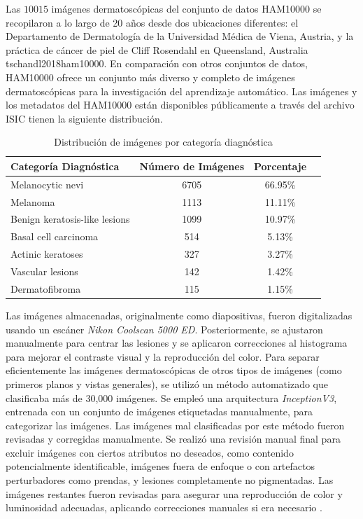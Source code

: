 Las $10015$ imágenes dermatoscópicas del conjunto de datos HAM10000 se recopilaron a lo largo de 20 años desde dos ubicaciones diferentes: el Departamento de Dermatología de la Universidad Médica de Viena, Austria, y la práctica de cáncer de piel de Cliff Rosendahl en Queensland, Australia {tschandl2018ham10000}. En comparación con otros conjuntos de datos, HAM10000 ofrece un conjunto más diverso y completo de imágenes dermatoscópicas para la investigación del aprendizaje automático. Las imágenes y los metadatos del HAM10000 están disponibles públicamente a través del archivo ISIC  tienen la siguiente distribución.

\begin{table}[ht]
   \centering
   \begin{tabular}{lccc}
   \hline
   \textbf{Categoría Diagnóstica} & \textbf{Número de Imágenes} & \textbf{Porcentaje} \\
   \hline
   Melanocytic nevi               & 6705                        & 66.95\%             \\
   Melanoma                       & 1113                        & 11.11\%             \\
   Benign keratosis-like lesions  & 1099                        & 10.97\%             \\
   Basal cell carcinoma           & 514                         & 5.13\%              \\
   Actinic keratoses              & 327                         & 3.27\%              \\
   Vascular lesions               & 142                         & 1.42\%              \\
   Dermatofibroma                 & 115                         & 1.15\%              \\
   \hline
   \end{tabular}
   \caption{Distribución de imágenes por categoría diagnóstica}
   \label{tab:ham10000_distribution}
\end{table}   
   
Las imágenes almacenadas, originalmente como diapositivas, fueron digitalizadas usando un escáner \textit{Nikon Coolscan 5000 ED}. Posteriormente, se ajustaron manualmente para centrar las lesiones y se aplicaron correcciones al histograma para mejorar el contraste visual y la reproducción del color. Para separar eficientemente las imágenes dermatoscópicas de otros tipos de imágenes (como primeros planos y vistas generales), se utilizó un método automatizado que clasificaba más de 30,000 imágenes. Se empleó una arquitectura \textit{InceptionV3}, entrenada con un conjunto de imágenes etiquetadas manualmente, para categorizar las imágenes. Las imágenes mal clasificadas por este método fueron revisadas y corregidas manualmente.  Se realizó una revisión manual final para excluir imágenes con ciertos atributos no deseados, como contenido potencialmente identificable, imágenes fuera de enfoque o con artefactos perturbadores como prendas, y lesiones completamente no pigmentadas. Las imágenes restantes fueron revisadas para asegurar una reproducción de color y luminosidad adecuadas, aplicando correcciones manuales si era necesario . 


